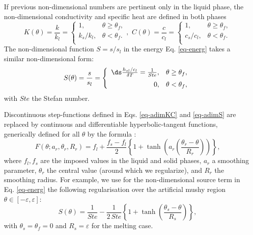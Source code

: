 If previous non-dimensional numbers are pertinent only in the liquid phase, the non-dimensional conductivity and specific heat are  defined in both phases
\begin{equation}\label{eq-adimKC}
K(\theta)= \frac{k}{k_l} =\left\{
\begin{matrix}
1, & \theta \geq \theta_f ,\\
k_s/k_l, & \theta < \theta_f .\\
\end{matrix}
\right.
, \,  \, C(\theta) = \frac{c}{c_l}=\left\{
\begin{matrix}
1, & \theta \geq \theta_f ,\\
c_s/c_l, & \theta < \theta_f .\\
\end{matrix}
\right.
\end{equation}
The non-dimensional function $S = s/s_l$ in the energy Eq. \ref{eq-energ} takes a similar non-dimensional form:
\begin{equation}\label{eq-adimS}
S(\theta)= \frac{s}{s_l} =\left\{
\begin{array}{rl} \vspace{0.2cm}
\ds \frac{h_{sl}/c_l}{\delta T} = \frac{1}{Ste}, & \theta \geq \theta_f ,\\
0, & \theta < \theta_f,\\
\end{array}
\right.
\end{equation}
with $Ste$ the Stefan number.

Discontinuous step-functions defined in Eqs. \ref{eq-adimKC}  and \ref{eq-adimS} are replaced by continuous and differentiable hyperbolic-tangent functions, generically defined for all $\theta$ by the formula \citep{dan-2014-JCP}:
\begin{equation}
F(\theta; a_r, \theta_r, R_r) = f_l + \frac{f_s-f_l}{2}\left\{
1 + \tanh\left( a_r \left(\frac{\theta_r-\theta}{R_r}\right)\right)
\right\},
\label{eq-smooth}
\end{equation}
where $f_l, f_s$ are the imposed values in the liquid and solid phases, $a_r$ a smoothing  parameter, $\theta_r$ the central value (around which we regularize), and $R_r$ the smoothing radius. For example, we use for the non-dimensional source term in Eq. \ref{eq-energ} the following regularisation over the artificial mushy region $\theta \in [-\varepsilon, \varepsilon]$:
\begin{equation}
S(\theta) = \frac{1}{Ste} - \frac{1}{2\,Ste}\left\{
1 + \tanh\left(\frac{\theta_s-\theta}{R_s}\right)
\right\},
\label{eq-Stanh}
\end{equation} 
with $\theta_s=\theta_f=0$ and $R_s=\varepsilon$ for the melting case. 


